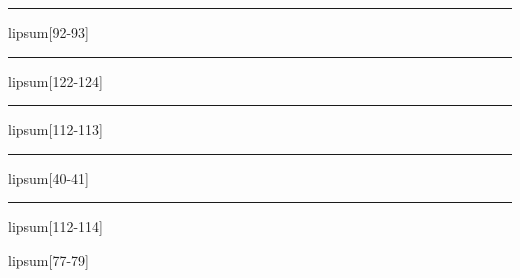 \documentclass[11pt,a4paper]{article}
\begin{document}
\begin{simplewrap}
  \textcolor{olive!57}{\rule{5.4cm}{4.5cm}}
\end{simplewrap}
lipsum[92-93]

\begin{simplewrap}
  \textcolor{lime!42}{\rule{3.6cm}{5.6cm}}
\end{simplewrap}
lipsum[122-124]

\begin{simplewrap}
  \textcolor{olive!15}{\rule{5.3cm}{8.5cm}}
\end{simplewrap}
lipsum[112-113]

\begin{simplewrap}
  \textcolor{green!12}{\rule{4.5cm}{9.8cm}}
\end{simplewrap}
lipsum[40-41]

\begin{simplewrap}
  \textcolor{cyan!50}{\rule{4.9cm}{2.7cm}}
\end{simplewrap}
lipsum[112-114]

lipsum[77-79]
\end{document}
